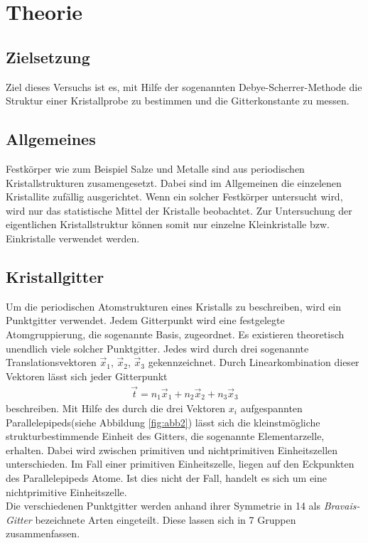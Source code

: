 \section{Theorie}
\label{sec:Theorie}

\subsection{Zielsetzung}
\label{subsec:Zielsetzung}
Ziel dieses Versuchs ist es, mit Hilfe der sogenannten
Debye-Scherrer-Methode die Struktur einer Kristallprobe
zu bestimmen und die Gitterkonstante zu messen.

\subsection{Allgemeines}
\label{subsec:allgemein}

Festkörper wie zum Beispiel Salze und Metalle
sind aus periodischen
Kristallstrukturen zusamengesetzt. Dabei sind im
Allgemeinen die einzelenen Kristallite zufällig
ausgerichtet. Wenn ein solcher Festkörper untersucht wird,
wird nur das statistische Mittel der Kristalle beobachtet.
Zur Untersuchung der eigentlichen Kristallstruktur
können somit nur einzelne Kleinkristalle bzw.
Einkristalle verwendet werden.


\subsection{Kristallgitter}
\label{subsec:kristallstrukturen}
Um die periodischen Atomstrukturen eines Kristalls
zu beschreiben, wird ein Punktgitter verwendet.
Jedem Gitterpunkt wird eine festgelegte Atomgruppierung,
die sogenannte Basis, zugeordnet.
Es existieren theoretisch unendlich viele solcher Punktgitter.
Jedes wird durch drei sogenannte Translationsvektoren
$\vec{x}_{1}$, $\vec{x}_{2}$, $\vec{x}_{3}$ gekennzeichnet.
Durch Linearkombination dieser Vektoren lässt sich
jeder Gitterpunkt
\begin{align}
  \label{eqn:1*}
  \vec{t} = n_{1} \vec{x}_{1} + n_{2} \vec{x}_{2} + n_{3} \vec{x}_{3}
\end{align}
beschreiben.
Mit Hilfe des durch die drei Vektoren $x_{i}$ aufgespannten
Parallelepipeds(siehe Abbildung \ref{fig:abb2}) lässt sich die
kleinstmögliche strukturbestimmende Einheit des Gitters,
die sogenannte Elementarzelle, erhalten.
Dabei wird zwischen primitiven und nichtprimitiven Einheitszellen
unterschieden. Im Fall einer primitiven Einheitszelle,
liegen auf den Eckpunkten des Parallelepipeds Atome.
Ist dies nicht der Fall, handelt es sich um eine
nichtprimitive Einheitszelle.\\
Die verschiedenen Punktgitter werden anhand ihrer Symmetrie
in 14 als \textit{Bravais-Gitter} bezeichnete Arten eingeteilt.
Diese lassen sich in 7 Gruppen zusammenfassen.

